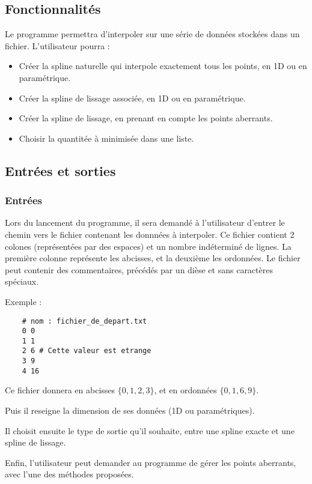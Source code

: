 \documentclass[a4paper,12pt]{article}
\begin{document}
\subsection{Fonctionnalités}
\label{Fonctions}

Le programme permettra d'interpoler sur une série de données stockées dans un fichier. L'utilisateur pourra :
\begin{itemize}
\item Créer la spline naturelle qui interpole exactement tous les points, en 1D ou en paramétrique.
\item Créer la spline de lissage associée, en  1D ou en paramétrique.
\item Créer la spline de lissage, en prenant en compte les points aberrants.
\item Choisir la quantitée à minimisée dans une liste.
\end{itemize}

\subsection{Entrées et sorties}

\subsubsection{Entrées}

Lors du lancement du programme, il sera demandé à l'utilisateur d'entrer le chemin vers le fichier contenant les donnnées à interpoler.
Ce fichier contient 2 colones (représentées par des espaces) et un nombre indéterminé de lignes. La première colonne représente les abcisses, et la deuxième les ordonnées. Le fichier peut contenir des commentaires, précédés par un dièse et sans caractères spéciaux.

Exemple :

\begin{lstlisting}
    # nom : fichier_de_depart.txt
    0 0
    1 1
    2 6 # Cette valeur est etrange
    3 9
    4 16
\end{lstlisting}

Ce fichier donnera en abcisses  $\{0,1,2,3\}$, et en ordonnées $\{0,1,6,9\}$.

Puis il reseigne la dimension de ses données (1D ou paramétriques).

Il choisit ensuite le type de sortie qu'il souhaite, entre une spline exacte et une spline de lissage.

Enfin, l'utilisateur peut demander au programme de gérer les points aberrants, avec l'une des méthodes proposées.
\end{document}
